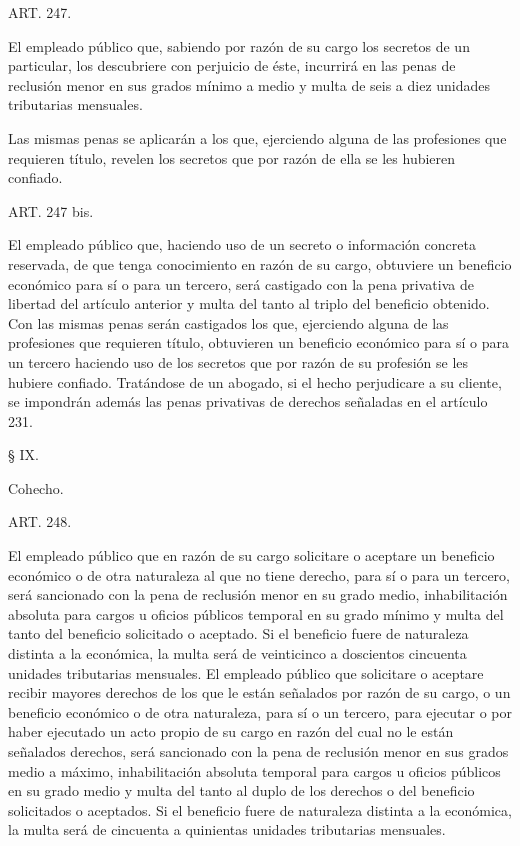     ART. 247.

    El empleado público que, sabiendo por razón de su cargo los secretos de un particular, los descubriere con perjuicio de éste, incurrirá en las penas de reclusión menor en sus grados mínimo a medio y multa de seis a diez unidades tributarias mensuales.

    Las mismas penas se aplicarán a los que, ejerciendo alguna de las profesiones que requieren título, revelen los secretos que por razón de ella se les hubieren confiado.




    ART. 247 bis.

    El empleado público que, haciendo uso de un secreto o información concreta reservada, de que tenga conocimiento en razón de su cargo, obtuviere un beneficio económico para sí o para un tercero, será castigado con la pena privativa de libertad del artículo anterior y multa del tanto al triplo del beneficio obtenido.
    Con las mismas penas serán castigados los que, ejerciendo alguna de las profesiones que requieren título, obtuvieren un beneficio económico para sí o para un tercero haciendo uso de los secretos que por razón de su profesión se les hubiere confiado. Tratándose de un abogado, si el hecho perjudicare a su cliente, se impondrán además las penas privativas de derechos señaladas en el artículo 231.


    § IX.

    Cohecho.


    ART. 248.

    El empleado público que en razón de su cargo solicitare o aceptare un beneficio económico o de otra naturaleza al que no tiene derecho, para sí o para un tercero, será sancionado con la pena de reclusión menor en su grado medio, inhabilitación absoluta para cargos u oficios públicos temporal en su grado mínimo y multa del tanto del beneficio solicitado o aceptado. Si el beneficio fuere de naturaleza distinta a la económica, la multa será de veinticinco a doscientos cincuenta unidades tributarias mensuales.
    El empleado público que solicitare o aceptare recibir mayores derechos de los que le están señalados por razón de su cargo, o un beneficio económico o de otra naturaleza, para sí o un tercero, para ejecutar o por haber ejecutado un acto propio de su cargo en razón del cual no le están señalados derechos, será sancionado con la pena de reclusión menor en sus grados medio a máximo, inhabilitación absoluta temporal para cargos u oficios públicos en su grado medio y multa del tanto al duplo de los derechos o del beneficio solicitados o aceptados. Si el beneficio fuere de naturaleza distinta a la económica, la multa será de cincuenta a quinientas unidades tributarias mensuales.





